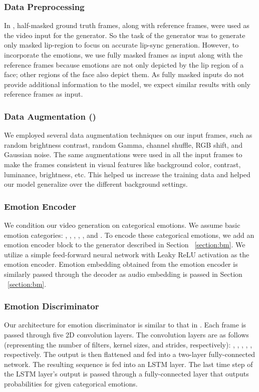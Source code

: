 \documentclass[accepted]{uai2023}
\begin{document}
\subsubsection{Data Preprocessing}
In \citep{prajwal2020lip}, half-masked ground truth frames, along with reference frames, were used as the video input for the generator. So the task of the generator was to generate only masked lip-region to focus on accurate lip-sync generation. However, to incorporate the emotions, we use fully masked frames as input along with the reference frames because emotions are not only depicted by the lip region of a face; other regions of the face also depict them. As fully masked inputs do not provide additional information to the model, we expect similar results with only reference frames as input. 

\subsubsection{Data Augmentation ()}
\label{section:da}
We employed several data augmentation techniques on our input frames, such as random brightness contrast, random Gamma, channel shuffle, RGB shift, and Gaussian noise. The same augmentations were used in all the input frames to make the frames consistent in visual features like background color, contrast, luminance, brightness, etc. This helped us increase the training data and helped our model generalize over the different background settings.








\subsubsection{Emotion Encoder}
We condition our video generation on categorical emotions. We assume  basic emotion categories: {},
{}, {}, {}, {}, and {}. 
To encode these categorical emotions, we add an emotion encoder block to the generator described in Section ~\ref{section:bm}. We utilize a simple feed-forward neural network with Leaky ReLU activation as the emotion encoder. Emotion embedding obtained from the emotion encoder is similarly passed through the decoder as audio embedding is passed in Section ~\ref{section:bm}.

\subsubsection{Emotion Discriminator}
Our architecture for emotion discriminator is similar to that in \citep{9496264}. Each frame is passed through five 2D convolution layers. The convolution layers are as follows (representing the number of filters, kernel sizes, and strides, respectively): , , , , , respectively. The output is then flattened and fed into a two-layer fully-connected network. The resulting sequence is fed into an LSTM \citep{hochreiter1997long} layer. The last time step of the LSTM layer's output is passed through a fully-connected layer that outputs probabilities for given categorical emotions.
\end{document}
